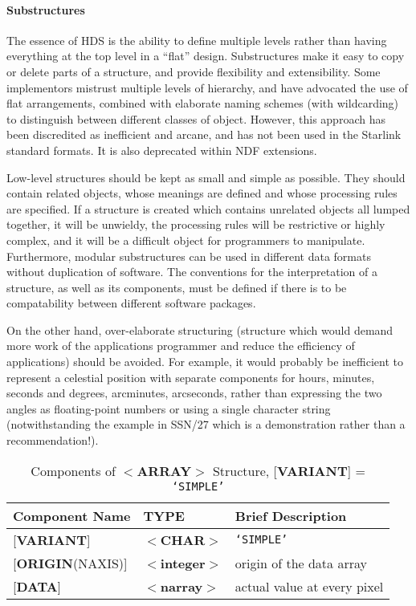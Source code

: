 \documentclass[twoside,11pt]{article}
\newcommand{\xref}[3]{#1}
\renewcommand{\_}{\texttt{\symbol{95}}}
\begin{document}
\paragraph{Substructures}
The essence of HDS is the ability to define
multiple levels rather than having everything at the
top level in a ``flat'' design.
Substructures make it easy to copy or delete parts of a structure, and
provide flexibility and extensibility.  Some implementors
mistrust multiple levels of hierarchy, and have advocated
the use of flat arrangements, combined with elaborate
naming schemes (with wildcarding) to distinguish between different
classes of object.  However, this approach has been
discredited as inefficient and arcane, and has not been used
in the Starlink standard formats.  It is also deprecated
within NDF extensions.

Low-level structures should be kept as small and simple as possible.
They should contain related objects, whose meanings are defined and
whose processing rules are specified.  If a
structure is created
which contains unrelated objects all lumped together, it
will be unwieldy, the
processing rules will be restrictive or highly complex, and it will
be a difficult object for programmers to manipulate.  Furthermore,
modular substructures can be used in different data formats without
duplication of software. The conventions for the interpretation of a
structure, as well as its components,
must be defined if there is to be compatability between
different software packages.

On the other hand, over-elaborate structuring (structure which would
demand more work of the applications programmer and reduce the
efficiency of applications) should be avoided.  For example, it
would probably be inefficient to represent a
celestial position with separate components for hours, minutes, seconds
and degrees, arcminutes, arcseconds, rather than expressing
the two angles as floating-point numbers or using
a single character string (notwithstanding the example in
\xref{SSN/27}{ssn27}, which is a demonstration rather than a recommendation!).

\begin{table}[htb]
\centering
\caption{Components of $<${\bf ARRAY}$>$ Structure,
{[}{\bf VARIANT}{]} = {\tt `SIMPLE'}}
\label{ta:example2}
\begin{tabular}{|l|l|l|}
\hline
Component Name  & TYPE & Brief Description \\ \hline
{[}{\bf VARIANT}{]} & $<${\bf \_CHAR}$>$ & {\tt `SIMPLE'} \\
{[}{\bf ORIGIN}(NAXIS){]} & $<${\bf integer}$>$ & origin of the data array \\
{[}{\bf DATA}{]} & $<${\bf narray}$>$ & actual value at every pixel \\ \hline
\end{tabular}
\end{table}
\end{document}
